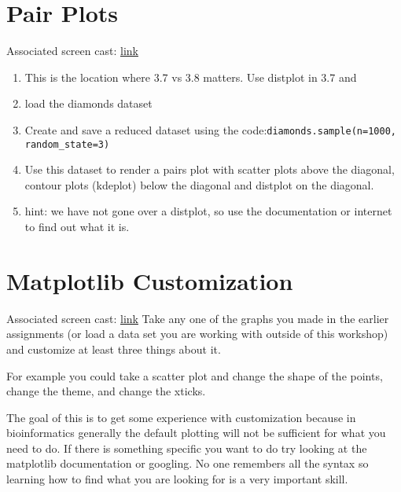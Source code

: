 \documentclass{article}
\begin{document}
\section{Pair Plots}
Associated screen cast: \href{https://www.youtube.com/watch?v=_buOJaXsm0Q}{link}
\begin{enumerate}
		\item This is the location where 3.7 vs 3.8 matters. Use distplot in 3.7 and 
		\item load the diamonds dataset 
		\item Create and save a reduced dataset using the code:\texttt{diamonds.sample(n=1000, random\_state=3)}
		\item Use this dataset to render a pairs plot with scatter plots above the diagonal, contour plots (kdeplot) below the diagonal and distplot on the diagonal.
		\item hint: we have not gone over a distplot, so use the documentation or internet to find out what it is.
\end{enumerate}
\section{Matplotlib Customization}
Associated screen cast: \href{https://www.youtube.com/watch?v=NDFtHuB-New}{link}
Take any one of the graphs you made in the earlier assignments (or load a data set you are working with outside of this workshop)  and customize at least three things about it.

For example you could take a scatter plot and change the shape of the points, change the theme, and change the xticks.

The goal of this is to get some experience with customization because in bioinformatics generally the default plotting will not be sufficient for what you need to do. If there is something specific you want to do try looking at the matplotlib documentation or googling. No one remembers all the syntax so learning how to find what you are looking for is a very important skill.
\end{document}
